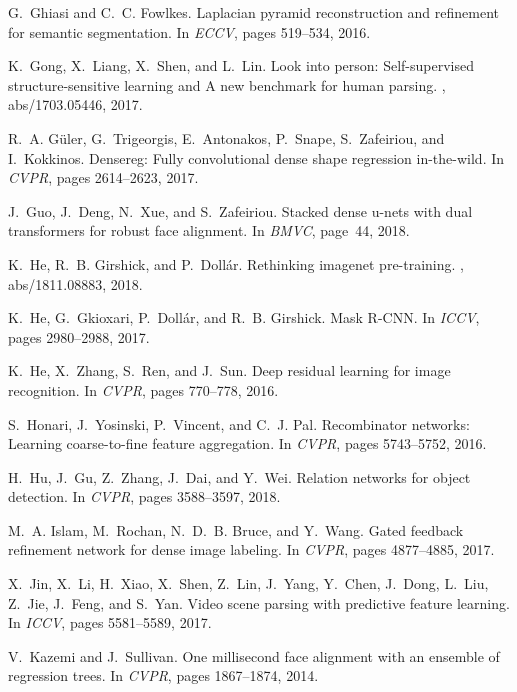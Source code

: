 \documentclass[10pt,twocolumn,letterpaper]{article}
\begin{document}
{\begin{thebibliography}{100}
G.~Ghiasi and C.~C. Fowlkes.
\newblock Laplacian pyramid reconstruction and refinement for semantic
  segmentation.
\newblock In {\em {ECCV}}, pages 519--534, 2016.

K.~Gong, X.~Liang, X.~Shen, and L.~Lin.
\newblock Look into person: Self-supervised structure-sensitive learning and
  {A} new benchmark for human parsing.
, abs/1703.05446, 2017.

R.~A. G{\"{u}}ler, G.~Trigeorgis, E.~Antonakos, P.~Snape, S.~Zafeiriou, and
  I.~Kokkinos.
\newblock Densereg: Fully convolutional dense shape regression in-the-wild.
\newblock In {\em {CVPR}}, pages 2614--2623, 2017.

J.~Guo, J.~Deng, N.~Xue, and S.~Zafeiriou.
\newblock Stacked dense u-nets with dual transformers for robust face
  alignment.
\newblock In {\em {BMVC}}, page~44, 2018.

K.~He, R.~B. Girshick, and P.~Doll{\'{a}}r.
\newblock Rethinking imagenet pre-training.
, abs/1811.08883, 2018.

K.~He, G.~Gkioxari, P.~Doll{\'{a}}r, and R.~B. Girshick.
\newblock Mask {R-CNN}.
\newblock In {\em {ICCV}}, pages 2980--2988, 2017.

K.~He, X.~Zhang, S.~Ren, and J.~Sun.
\newblock Deep residual learning for image recognition.
\newblock In {\em {CVPR}}, pages 770--778, 2016.

S.~Honari, J.~Yosinski, P.~Vincent, and C.~J. Pal.
\newblock Recombinator networks: Learning coarse-to-fine feature aggregation.
\newblock In {\em {CVPR}}, pages 5743--5752, 2016.

H.~Hu, J.~Gu, Z.~Zhang, J.~Dai, and Y.~Wei.
\newblock Relation networks for object detection.
\newblock In {\em {CVPR}}, pages 3588--3597, 2018.

M.~A. Islam, M.~Rochan, N.~D.~B. Bruce, and Y.~Wang.
\newblock Gated feedback refinement network for dense image labeling.
\newblock In {\em {CVPR}}, pages 4877--4885, 2017.

X.~Jin, X.~Li, H.~Xiao, X.~Shen, Z.~Lin, J.~Yang, Y.~Chen, J.~Dong, L.~Liu,
  Z.~Jie, J.~Feng, and S.~Yan.
\newblock Video scene parsing with predictive feature learning.
\newblock In {\em {ICCV}}, pages 5581--5589, 2017.

V.~Kazemi and J.~Sullivan.
\newblock One millisecond face alignment with an ensemble of regression trees.
\newblock In {\em {CVPR}}, pages 1867--1874, 2014.


\end{thebibliography}}
\end{document}
